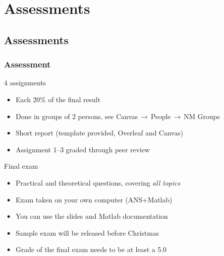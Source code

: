 \section{Assessments}
\subsection{Assessments}
{\nologo
\begin{frame}
 \frametitle{Assessment}
 \begin{block}{4 assignments}
  \begin{itemize}
    \item Each 20\% of the final result
    \item Done in groups of 2 persons, see Canvas$\,\to\,$People$\,\to\,$NM Groups
    \item Short report (template provided, Overleaf and Canvas)
    \item Assignment 1--3 graded through peer review
    \end{itemize}   
 \end{block}
 \pause
 \begin{block}{Final exam}
  \begin{itemize}
    \item Practical and theoretical questions, covering \emph{all topics}
    \item Exam taken on your own computer (ANS+Matlab)
    \item You can use the slides and Matlab documentation
    \item Sample exam will be released before Christmas
    \item Grade of the final exam needs to be at least a 5.0
  \end{itemize}   
 \end{block}
\end{frame}
}

